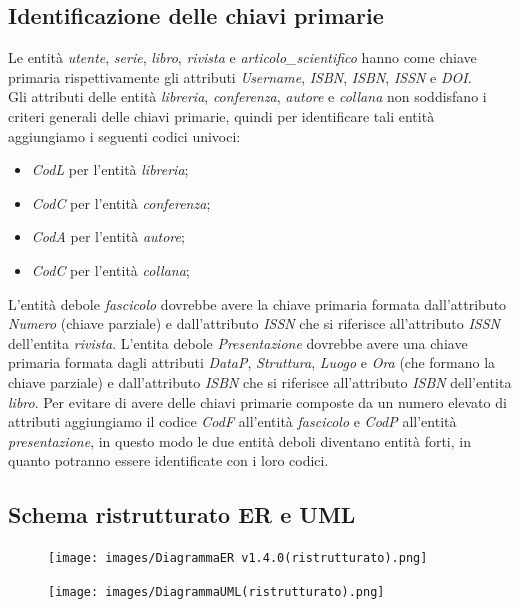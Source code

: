 \documentclass{article}
\begin{document}
\subsection{Identificazione delle chiavi primarie}
Le entità \textit{utente}, \textit{serie}, \textit{libro}, \textit{rivista} e \textit{articolo\_scientifico} hanno come chiave primaria rispettivamente gli attributi \textit{Username}, \textit{ISBN}, \textit{ISBN}, \textit{ISSN} e \textit{DOI}.\\
Gli attributi delle entità \textit{libreria}, \textit{conferenza}, \textit{autore} e \textit{collana} non soddisfano i criteri generali delle chiavi primarie, quindi per identificare tali entità aggiungiamo i seguenti codici univoci:
\begin{itemize} 
\item \textit{CodL} per l'entità \textit{libreria}; 
\item \textit{CodC} per l'entità \textit{conferenza}; 
\item \textit{CodA} per l'entità \textit{autore}; 
\item \textit{CodC} per l'entità \textit{collana}; 
\end{itemize}
L'entità debole \textit{fascicolo} dovrebbe avere la chiave primaria formata dall'attributo \textit{Numero} (chiave parziale) e dall'attributo \textit{ISSN} che si riferisce all'attributo \textit{ISSN} dell'entita \textit{rivista}. L'entita debole \textit{Presentazione} dovrebbe avere una chiave primaria formata dagli attributi \textit{DataP}, \textit{Struttura}, \textit{Luogo} e \textit{Ora} (che formano la chiave parziale) e dall'attributo \textit{ISBN} che si riferisce all'attributo \textit{ISBN} dell'entita \textit{libro}. Per evitare di avere delle chiavi primarie composte da un numero elevato di attributi aggiungiamo il codice \textit{CodF} all'entità \textit{fascicolo} e \textit{CodP} all'entità \textit{presentazione}, in questo modo le due entità deboli diventano entità forti, in quanto potranno essere identificate con i loro codici.

\newpage
\subsection{Schema ristrutturato ER e UML}

\begin{figure}[htp!]
    \texttt{[image: images/DiagrammaER v1.4.0(ristrutturato).png]}
\end{figure}
\begin{figure}[htp!]
    \texttt{[image: images/DiagrammaUML(ristrutturato).png]}
\end{figure}
\end{document}

